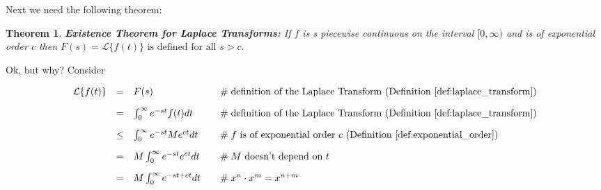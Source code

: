 \documentclass{article}
\newtheorem{thm}{Theorem}[section]
\theoremstyle{definition}
\begin{document}
\bigskip
\noindent
Next we need the following theorem:

\bigskip

\begin{thm} 
{\bf Existence Theorem for Laplace Transforms:} 
\normalfont If $f$ is s piecewise continuous on the interval $[0,\infty)$ and is of exponential order $c$ then 
$F (s) = \mathcal{L}\{f (t)\} \text{ is defined for all $s > c$}.$
\end{thm}

\bigskip
\noindent
Ok, but why? Consider

\begin{equation*}
\begin{array}{lllll}
\mathcal{L}\{f(t)\}
&=& F(s)                                                                            &\quad  \mathrel{\#} \text{definition of the Laplace Transform (Definition \ref{def:laplace_transform})}                                                              \\  
[10pt]                                                                                 %
&=& \int_0^\infty e^{-st} f(t) dt                                            &\quad  \mathrel{\#} \text{definition of the Laplace Transform (Definition \ref{def:laplace_transform})}                                                              \\  
[10pt]                                                                                 %
&\leq& \int_0^\infty e^{-st}  Me^{ct}dt                                &\quad  \mathrel{\#} \text{$f$ is of exponential order $c$ (Definition \ref{def:exponential_order})}                                                                     \\  
[10pt]                                                                                 %
&=& M  \int_0^\infty e^{-st} e^{ct} dt                                  &\quad  \mathrel{\#} \text{$M$ doesn't depend on $t$}                                                                                                                                       \\   
[10pt]                                                                                %
&=& M  \int_0^\infty  e^{-st + ct}  dt                                  &\quad  \mathrel{\#} \text{$x^n \cdot x^m = x^{n+m}$}                                                                                                                                         \\      

\end{array}
\end{equation*}
\end{document}
